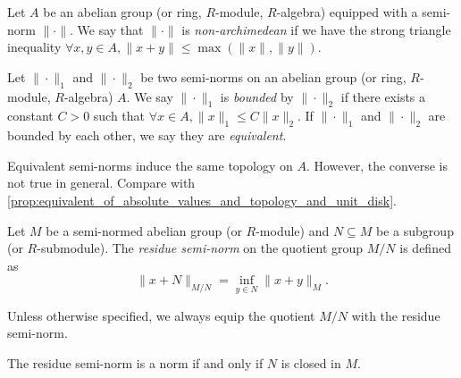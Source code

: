     \begin{definition}\label{def:nonarchimedean_seminorm}
        Let \(A\) be an abelian group (or ring, \(R\)-module, \(R\)-algebra) equipped with a semi-norm \(\|\cdot\|\).
        We say that \(\|\cdot\|\) is \emph{non-archimedean} if we have the strong triangle inequality
        \(\forall x,y \in A, \|x + y\| \leq \max(\|x\|, \|y\|)\).
    \end{definition}

    \begin{definition}\label{def:bounded_semi-norm}
        Let \(\|\cdot\|_1\) and \(\|\cdot\|_2\) be two semi-norms on an abelian group (or ring, \(R\)-module, \(R\)-algebra) \(A\).
        We say \(\|\cdot\|_1\) is \emph{bounded} by \(\|\cdot\|_2\) if there exists a constant \(C > 0\) such that \(\forall x \in A, \|x\|_1 \leq C\|x\|_2\).
        If \(\|\cdot\|_1\) and \(\|\cdot\|_2\) are bounded by each other, we say they are \emph{equivalent}.
    \end{definition}

    \begin{remark}\label{rmk:semi-norms_bounded_by_each_other_induces_the_same_topologies}
        Equivalent semi-norms induce the same topology on \(A\).
        However, the converse is not true in general.
        Compare with \cref{prop:equivalent_of_absolute_values_and_topology_and_unit_disk}.

    \end{remark}

    \begin{definition}\label{def:residue_semi-norm}
        Let \(M\) be a semi-normed abelian group (or \(R\)-module) and \(N \subseteq M\) be a subgroup (or \(R\)-submodule).
        The \emph{residue semi-norm} on the quotient group \(M/N\) is defined as
        \[
            \|x + N\|_{M/N} = \inf_{y \in N} \|x + y\|_M.
        \]
    \end{definition}

    Unless otherwise specified, we always equip the quotient \(M/N\) with the residue semi-norm.

    \begin{remark}\label{rmk:residue_semi-norm_is_a_norm_iff_N_is_closed}
        The residue semi-norm is a norm if and only if \(N\) is closed in \(M\).
    \end{remark}

